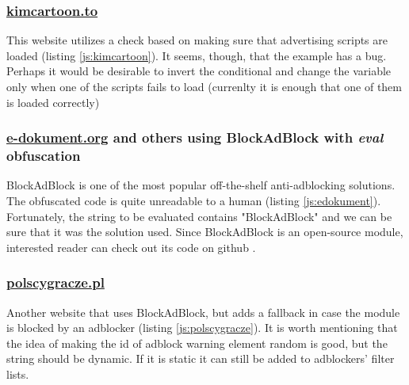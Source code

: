 
                       
\subsubsection{\url{kimcartoon.to}}
This website utilizes a check based on making sure that advertising scripts
are loaded (listing \ref{js:kimcartoon}). It seems, though, that the example has a bug.
Perhaps it would be desirable to invert the conditional and change the variable
only when one of the scripts fails to load (currenlty it is enough that one of them is loaded correctly)


                       
\subsubsection{\url{e-dokument.org} and others using BlockAdBlock with \emph{eval} obfuscation}
BlockAdBlock is one of the most popular off-the-shelf anti-adblocking solutions.
The obfuscated code is quite unreadable to a human (listing \ref{js:edokument}).
Fortunately, the string to be evaluated contains "BlockAdBlock" and we can be sure that it was
the solution used. Since BlockAdBlock is an open-source module, interested reader can check 
out its code on github \cite{github:blockadblock}.



\subsubsection{\url{polscygracze.pl}}
Another website that uses BlockAdBlock, but adds a fallback in case the module is blocked
by an adblocker (listing \ref{js:polscygracze}). It is worth mentioning that the idea of 
making the id of adblock warning element random is good, but the string should be dynamic. 
If it is static it can still be added to adblockers' filter lists.
                       


